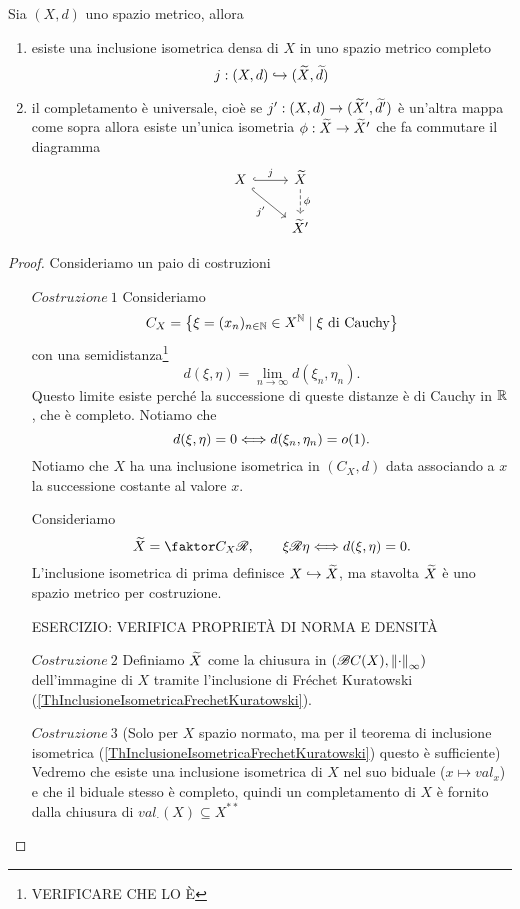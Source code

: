 \begin{proposition}[Completamento]\label{PrCompletamento}
Sia $(X,d)$ uno spazio metrico, allora
\begin{enumerate}
    \item esiste una inclusione isometrica densa di $X$ in uno spazio metrico completo
    \[j:(X,d)\hookrightarrow (\widetilde{X},\widetilde{d})\]
    \item il completamento \`e universale, cio\`e se $j':(X,d)\to (\widetilde{X}',\widetilde{d}')$ \`e un'altra mappa come sopra allora esiste un'unica isometria $\phi:\widetilde{X}\to \widetilde{X}'$ che fa commutare il diagramma
    \[\begin{tikzcd}
        X & {\wt X} \\
        & {\wt X'}
        \arrow["j", hook, from=1-1, to=1-2]
        \arrow["{j'}"', hook, from=1-1, to=2-2]
        \arrow["\phi", dashed, from=1-2, to=2-2]
    \end{tikzcd}\]
\end{enumerate}
\end{proposition}
\begin{proof}
Consideriamo un paio di costruzioni
\setlength{\leftmargini}{0cm}
\begin{itemize}
\item[$\boxed{Costruzione\ 1}$] Consideriamo
\[C_X=\left\{{\xi=(x_n)_{n\in\mathbb{N}}\in X^{\mathbb{N}}\mid \xi\text{ di Cauchy}}\right\}\]
con una semidistanza\footnote{VERIFICARE CHE LO \`E}
\[d(\xi,\eta)=\lim_{n\to\infty}d(\xi_n,\eta_n).\]
Questo limite esiste perch\'e la successione di queste distanze \`e di Cauchy in $\mathbb{R}$, che \`e completo. Notiamo che
\[d(\xi,\eta)=0\Longleftrightarrow d(\xi_n,\eta_n)=o(1).\]
Notiamo che $X$ ha una inclusione isometrica in $(C_X,d)$ data associando a $x$ la successione costante al valore $x$.

Consideriamo
\[\wt X=\quot{C_X}\Rs,\qquad \xi\Rs\eta\coimplies d(\xi,\eta)=0.\]
L'inclusione isometrica di prima definisce $X\hookrightarrow \widetilde{X}$, ma stavolta $\widetilde{X}$ \`e uno spazio metrico per costruzione.

ESERCIZIO: VERIFICA PROPRIET\`A DI NORMA E DENSIT\`A
\item[$\boxed{Costruzione\ 2}$] Definiamo $\widetilde{X}$ come la chiusura in $(\mathscr{B} C(X),\left\Vert{\cdot}\right\Vert_\infty)$ dell'immagine di $X$ tramite l'inclusione di Fr\'echet Kuratowski (\ref{ThInclusioneIsometricaFrechetKuratowski}).
\item[$\boxed{Costruzione\ 3}$] (Solo per $X$ spazio normato, ma per il teorema di inclusione isometrica (\ref{ThInclusioneIsometricaFrechetKuratowski}) questo \`e sufficiente) Vedremo che esiste una inclusione isometrica di $X$ nel suo biduale ($x\mapsto val_x$) e che il biduale stesso \`e completo, quindi un completamento di $X$ \`e fornito dalla chiusura di $val_\cdot(X)\subseteq X^{\ast\ast}$
\end{itemize}
\setlength{\leftmargini}{0.5cm}

\end{proof}


